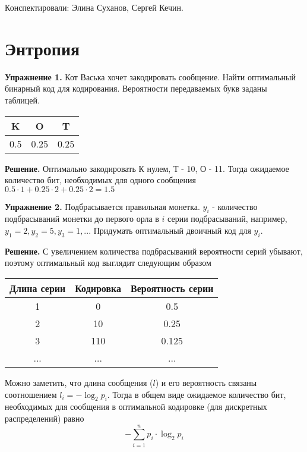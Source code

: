 \documentclass[12pt]{article} %
\theoremstyle{definition} %
\begin{document}
Конспектировали: Элина Суханов, Сергей Кечин.\\

\section{Энтропия}
    \textbf{Упражнение 1.}
    Кот Васька хочет закодировать сообщение. Найти оптимальный бинарный код для кодирования. Вероятности передаваемых букв заданы таблицей.
    \begin{table}[!hbt]
		\begin{center}
		\label{tab:simParameters}
		\begin{tabular}{ccc}
			\hline
			K & O & T \\
			\hline
			0.5 & 0.25 & 0.25 \\
			\hline
		\end{tabular}
		\end{center}
	\end{table}

    \textbf{Решение.}
    Оптимально закодировать К нулем, Т - 10, О - 11. Тогда ожидаемое количество бит, необходимых для одного сообщения $0.5 \cdot 1 + 0.25 \cdot 2 + 0.25 \cdot 2 = 1.5$
    
    \textbf{Упражнение 2.}
    Подбрасывается правильная монетка. $y_i$ - количество подбрасываний монетки до первого орла в $i$ серии подбрасываний, например, $y_1 = 2, y_2 = 5, y_3 = 1, ...$ Придумать оптимальный двоичный код для $y_i$.
    
    \textbf{Решение.}
    С увеличением количества подбрасываний вероятности серий убывают, поэтому оптимальный код выглядит следующим образом
    \begin{table}[!hbt]
		\begin{center}
		\label{tab:simParameters}
		\begin{tabular}{ccc}
			\hline
			Длина серии & Кодировка & Вероятность серии \\
			\hline
			1 & 0 & 0.5 \\
			\hline
			2 & 10 & 0.25 \\
			\hline
			3 & 110 & 0.125 \\
			\hline
			... & ... & ... \\
		    \hline	
		\end{tabular}
		\end{center}
	\end{table}
    
    Можно заметить, что длина сообщения ($l$) и его вероятность связаны соотношением $l_i=-\log_2 p_i$. Тогда в общем виде ожидаемое количество бит, необходимых для сообщения в оптимальной кодировке (для дискретных распределений) равно
    \[
    -\sum_{i=1}^{n} p_i\cdot\log_2 p_i
    \]
    
\end{document}

